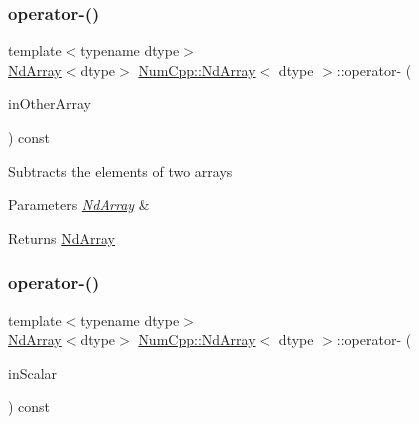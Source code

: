 \subsubsection{\texorpdfstring{operator-\/()}{operator-()}\hspace{0.1cm}{\footnotesize\ttfamily [1/2]}}
{\footnotesize\ttfamily template$<$typename dtype$>$ \\
\mbox{\hyperlink{class_num_cpp_1_1_nd_array}{Nd\+Array}}$<$dtype$>$ \mbox{\hyperlink{class_num_cpp_1_1_nd_array}{Num\+Cpp\+::\+Nd\+Array}}$<$ dtype $>$\+::operator-\/ (\begin{DoxyParamCaption}\item[{const \mbox{\hyperlink{class_num_cpp_1_1_nd_array}{Nd\+Array}}$<$ dtype $>$ \&}]{in\+Other\+Array }\end{DoxyParamCaption}) const\hspace{0.3cm}{\ttfamily [inline]}}

Subtracts the elements of two arrays


\begin{DoxyParams}{Parameters}
{\em \mbox{\hyperlink{class_num_cpp_1_1_nd_array}{Nd\+Array}}} & \\
\hline
\end{DoxyParams}
\begin{DoxyReturn}{Returns}
\mbox{\hyperlink{class_num_cpp_1_1_nd_array}{Nd\+Array}} 
\end{DoxyReturn}
\mbox{\label{class_num_cpp_1_1_nd_array_a1b0d4f050529450d7232abd459168341}} 
\subsubsection{\texorpdfstring{operator-\/()}{operator-()}\hspace{0.1cm}{\footnotesize\ttfamily [2/2]}}
{\footnotesize\ttfamily template$<$typename dtype$>$ \\
\mbox{\hyperlink{class_num_cpp_1_1_nd_array}{Nd\+Array}}$<$dtype$>$ \mbox{\hyperlink{class_num_cpp_1_1_nd_array}{Num\+Cpp\+::\+Nd\+Array}}$<$ dtype $>$\+::operator-\/ (\begin{DoxyParamCaption}\item[{dtype}]{in\+Scalar }\end{DoxyParamCaption}) const\hspace{0.3cm}{\ttfamily [inline]}}

